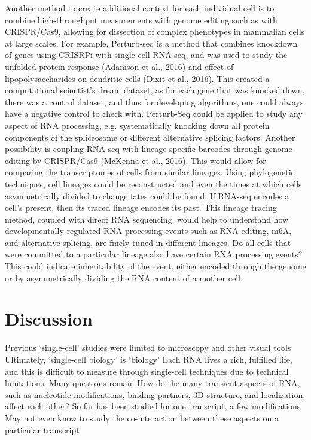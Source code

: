 Another method to create additional context for each individual cell is to combine high-throughput measurements with genome editing such as with CRISPR/Cas9, allowing for dissection of complex phenotypes in mammalian cells at large scales. For example, Perturb-seq is a method that combines knockdown of genes using CRISRPi with single-cell RNA-seq, and was used to study the unfolded protein response (Adamson et al., 2016) and effect of lipopolysaccharides on dendritic cells (Dixit et al., 2016). This created a computational scientist's dream dataset, as for each gene that was knocked down, there was a control dataset, and thus for developing algorithms, one could always have a negative control to check with. Perturb-Seq could be applied to study any aspect of RNA processing, e.g. systematically knocking down all protein components of the spliceosome or different alternative splicing factors. 
Another possibility is coupling RNA-seq with lineage-specific barcodes through genome editing by CRISPR/Cas9 (McKenna et al., 2016). This would allow for comparing the transcriptomes of cells from similar lineages. Using phylogenetic techniques, cell lineages could be reconstructed and even the times at which cells asymmetrically divided to change fates could be found. If RNA-seq encodes a cell's present, then its traced lineage encodes its past. This lineage tracing method, coupled with direct RNA sequencing, would help to understand how developmentally regulated RNA processing events such as RNA editing, m6A, and alternative splicing, are finely tuned in different lineages. Do all cells that were committed to a particular lineage also have certain RNA processing events? This could indicate inheritability of the event, either encoded through the genome or by asymmetrically dividing the RNA content of a mother cell.


\section{Discussion}

Previous ‘single-cell' studies were limited to microscopy and other visual tools
Ultimately, ‘single-cell biology' is ‘biology'
Each RNA lives a rich, fulfilled life, and this is difficult to measure through single-cell techniques due to technical limitations.
Many questions remain
How do the many transient aspects of RNA, such as nucleotide modifications, binding partners, 3D structure, and localization, affect each other?
So far has been studied for one transcript, a few modifications
May not even know to study the co-interaction between these aspects on a particular transcript
